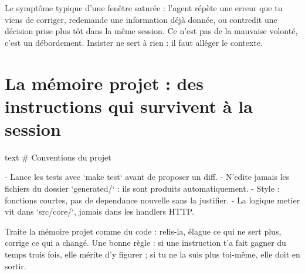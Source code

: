 \begin{avertissement}
Le symptôme typique d'une fenêtre saturée : l'agent répète une erreur que tu
viens de corriger, redemande une information déjà donnée, ou contredit une
décision prise plus tôt dans la même session. Ce n'est pas de la mauvaise
volonté, c'est un débordement. Insister ne sert à rien : il faut alléger le
contexte.
\end{avertissement}


\section{La mémoire projet : des instructions qui survivent à la session}



\begin{extraitcode}{text}
# Conventions du projet

- Lance les tests avec `make test` avant de proposer un diff.
- N'edite jamais les fichiers du dossier `generated/` : ils sont produits
  automatiquement.
- Style : fonctions courtes, pas de dependance nouvelle sans la justifier.
- La logique metier vit dans `src/core/`, jamais dans les handlers HTTP.
\end{extraitcode}


\begin{astuce}
Traite la mémoire projet comme du code : relis-la, élague ce qui ne sert plus,
corrige ce qui a changé. Une bonne règle : si une instruction t'a fait gagner
du temps trois fois, elle mérite d'y figurer ; si tu ne la suis plus toi-même,
elle doit en sortir.
\end{astuce}

